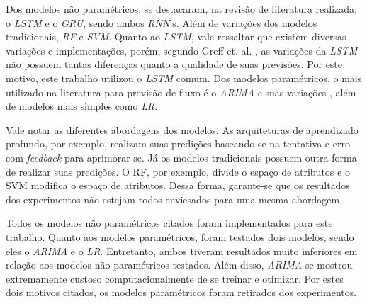 Dos modelos não paramétricos, se destacaram, na revisão de literatura realizada, o \textit{\acrshort{LSTM}} e o \textit{\acrshort{GRU}}, sendo ambos \textit{\acrshort{RNN}}'s. Além de variações dos modelos tradicionais, \textit{\acrshort{RF}} e \textit{\acrshort{SVM}}. Quanto ao \textit{\acrshort{LSTM}}, vale ressaltar que existem diversas variações e implementações, porém, segundo Greff et. al. \cite{Greff_2015}, as variações da \textit{\acrshort{LSTM}} não possuem tantas diferenças quanto a qualidade de suas previsões. Por este motivo, este trabalho utilizou o \textit{\acrshort{LSTM}} comum. Dos modelos paramétricos, o mais utilizado na literatura para previsão de fluxo é o \textit{\acrshort{ARIMA}} e suas variações \cite{doi:10.1080/01441647.2014.992496}, além de modelos mais simples como \textit{\acrfull{LR}}.

Vale notar as diferentes abordagens dos modelos. As arquiteturas de aprendizado profundo, por exemplo, realizam suas predições baseando-se na tentativa e erro com \textit{feedback} para aprimorar-se. Já os modelos tradicionais possuem outra forma de realizar suas predições. O \acrshort{RF}, por exemplo, divide o espaço de atributos e o \acrshort{SVM} modifica o espaço de atributos. Dessa forma, garante-se que os resultados dos experimentos não estejam todos enviesados para uma mesma abordagem.

Todos os modelos não paramétricos citados foram implementados para este trabalho. Quanto aos modelos paramétricos, foram testados dois modelos, sendo eles o \textit{\acrshort{ARIMA}} e o \textit{\acrshort{LR}}. Entretanto, ambos tiveram resultados muito inferiores em relação aos modelos não paramétricos testados. Além disso, \textit{\acrshort{ARIMA}} se mostrou extremamente custoso computacionalmente de se treinar e otimizar. Por estes dois motivos citados, os modelos paramétricos foram retirados dos experimentos.




